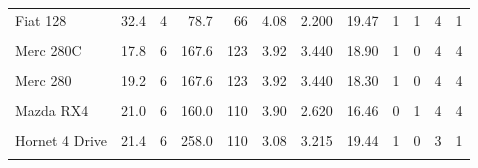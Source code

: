 \documentclass[
]{book}
\begin{document}
\begin{table}[!h]
\begin{tabular}{l|r|r|r|r|r|r|r|r|r|r|r}
\hline
\cellcolor{gray!6}{Lotus Europa} & \cellcolor{gray!6}{30.4} & \cellcolor{gray!6}{4} & \cellcolor{gray!6}{95.1} & \cellcolor{gray!6}{113} & \cellcolor{gray!6}{3.77} & \cellcolor{gray!6}{1.513} & \cellcolor{gray!6}{16.90} & \cellcolor{gray!6}{1} & \cellcolor{gray!6}{1} & \cellcolor{gray!6}{5} & \cellcolor{gray!6}{2}\\
\hline
Fiat 128 & 32.4 & 4 & 78.7 & 66 & 4.08 & 2.200 & 19.47 & 1 & 1 & 4 & 1\\
\hline
\cellcolor{gray!6}{Toyota Corolla} & \cellcolor{gray!6}{33.9} & \cellcolor{gray!6}{4} & \cellcolor{gray!6}{71.1} & \cellcolor{gray!6}{65} & \cellcolor{gray!6}{4.22} & \cellcolor{gray!6}{1.835} & \cellcolor{gray!6}{19.90} & \cellcolor{gray!6}{1} & \cellcolor{gray!6}{1} & \cellcolor{gray!6}{4} & \cellcolor{gray!6}{1}\\
\hline
Merc 280C & 17.8 & 6 & 167.6 & 123 & 3.92 & 3.440 & 18.90 & 1 & 0 & 4 & 4\\
\hline
\cellcolor{gray!6}{Valiant} & \cellcolor{gray!6}{18.1} & \cellcolor{gray!6}{6} & \cellcolor{gray!6}{225.0} & \cellcolor{gray!6}{105} & \cellcolor{gray!6}{2.76} & \cellcolor{gray!6}{3.460} & \cellcolor{gray!6}{20.22} & \cellcolor{gray!6}{1} & \cellcolor{gray!6}{0} & \cellcolor{gray!6}{3} & \cellcolor{gray!6}{1}\\
\hline
Merc 280 & 19.2 & 6 & 167.6 & 123 & 3.92 & 3.440 & 18.30 & 1 & 0 & 4 & 4\\
\hline
\cellcolor{gray!6}{Ferrari Dino} & \cellcolor{gray!6}{19.7} & \cellcolor{gray!6}{6} & \cellcolor{gray!6}{145.0} & \cellcolor{gray!6}{175} & \cellcolor{gray!6}{3.62} & \cellcolor{gray!6}{2.770} & \cellcolor{gray!6}{15.50} & \cellcolor{gray!6}{0} & \cellcolor{gray!6}{1} & \cellcolor{gray!6}{5} & \cellcolor{gray!6}{6}\\
\hline
Mazda RX4 & 21.0 & 6 & 160.0 & 110 & 3.90 & 2.620 & 16.46 & 0 & 1 & 4 & 4\\
\hline
\cellcolor{gray!6}{Mazda RX4 Wag} & \cellcolor{gray!6}{21.0} & \cellcolor{gray!6}{6} & \cellcolor{gray!6}{160.0} & \cellcolor{gray!6}{110} & \cellcolor{gray!6}{3.90} & \cellcolor{gray!6}{2.875} & \cellcolor{gray!6}{17.02} & \cellcolor{gray!6}{0} & \cellcolor{gray!6}{1} & \cellcolor{gray!6}{4} & \cellcolor{gray!6}{4}\\
\hline
Hornet 4 Drive & 21.4 & 6 & 258.0 & 110 & 3.08 & 3.215 & 19.44 & 1 & 0 & 3 & 1\\
\hline
\cellcolor{gray!6}{Cadillac Fleetwood} & \cellcolor{gray!6}{10.4} & \cellcolor{gray!6}{8} & \cellcolor{gray!6}{472.0} & \cellcolor{gray!6}{205} & \cellcolor{gray!6}{2.93} & \cellcolor{gray!6}{5.250} & \cellcolor{gray!6}{17.98} & \cellcolor{gray!6}{0} & \cellcolor{gray!6}{0} & \cellcolor{gray!6}{3} & \cellcolor{gray!6}{4}\\

\end{tabular}
\end{table}
\end{document}
